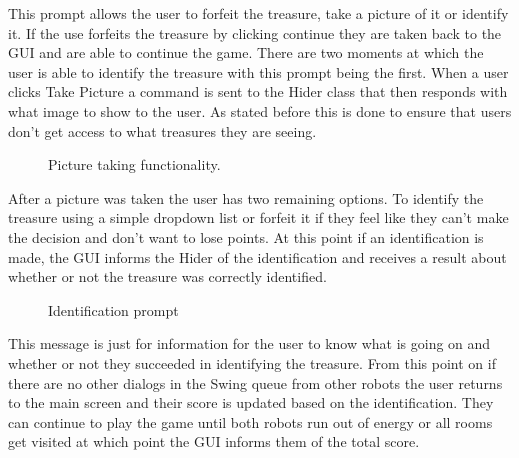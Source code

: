       This prompt allows the user to forfeit the treasure, take a picture of it or identify it. If the use forfeits the treasure by clicking continue they are taken back to the GUI and are able to continue the game. There are two moments at which the user is able to identify the treasure with this prompt being the first. When a user clicks Take Picture a command is sent to the Hider class that then responds with what image to show to the user. As stated before this is done to ensure that users don't get access to what treasures they are seeing.

      \begin{figure}[htp]
        \centering
        \caption{Picture taking functionality.}
      \end{figure}

      After a picture was taken the user has two remaining options. To identify the treasure using a simple dropdown list or forfeit it if they feel like they can't make the decision and don't want to lose points. At this point if an identification is made, the GUI informs the Hider of the identification and receives a result about whether or not the treasure was correctly identified.

      \begin{figure}[htp]
        \centering
        \caption{Identification prompt}
      \end{figure}

      This message is just for information for the user to know what is going on and whether or not they succeeded in identifying the treasure. From this point on if there are no other dialogs in the Swing queue from other robots the user returns to the main screen and their score is updated based on the identification. They can continue to play the game until both robots run out of energy or all rooms get visited at which point the GUI informs them of the total score.


